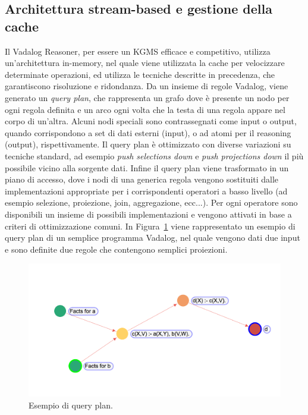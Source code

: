 \subsection{Architettura stream-based e gestione della cache}

Il Vadalog Reasoner, per essere un KGMS efficace e competitivo, utilizza un'architettura in-memory, nel quale viene utilizzata la cache per velocizzare determinate operazioni, ed utilizza le tecniche descritte in precedenza, che garantiscono risoluzione e ridondanza. \newline
Da un insieme di regole Vadalog, viene generato un \textit{query plan}, che rappresenta un grafo dove è presente un nodo per ogni regola definita e un arco ogni volta che la testa di una regola appare nel corpo di un'altra. \newline
Alcuni nodi speciali sono contrassegnati come input o output, quando corrispondono a set di dati esterni (input), o ad atomi per il reasoning (output), rispettivamente.
Il query plan è ottimizzato con diverse variazioni su tecniche standard, ad esempio \textit{push selections down} e \textit{push projections down} il più possibile vicino alla sorgente dati. \newline
Infine il query plan viene trasformato in un piano di accesso, dove i nodi di una generica regola vengono sostituiti dalle implementazioni appropriate per i corrispondenti operatori a basso livello (ad esempio selezione, proiezione, join, aggregazione, ecc...). \newline
Per ogni operatore sono disponibili un insieme di possibili implementazioni e vengono attivati in base a criteri di ottimizzazione comuni. \newline
In Figura~\ref{fig:query_plan_1} viene rappresentato un esempio di query plan di un semplice programma Vadalog, nel quale vengono dati due input e sono definite due regole che contengono semplici proiezioni. 
\begin{figure}[h!]
	\centering
	\includegraphics[width=0.8\linewidth]{figure/query-plan-ex1}
	\caption{Esempio di query plan.}
	\label{fig:query_plan_1}
\end{figure}

